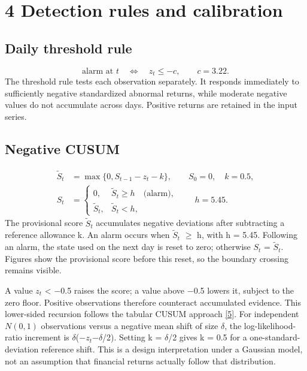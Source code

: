 \documentclass[11pt,a4paper]{article}
\begin{document}
\clearpage
\section*{4 Detection rules and calibration}
\subsection*{Daily threshold rule}
\begin{equation}\text{alarm at }t\quad\Longleftrightarrow\quad z_t\leq-c,\qquad c=3.22.\label{eq:threshold}\end{equation}
The threshold rule tests each observation separately. It responds immediately to sufficiently negative standardized abnormal returns, while moderate negative values do not accumulate across days. Positive returns are retained in the input series.

\subsection*{Negative CUSUM}
\begin{equation}\begin{aligned}\widetilde S_t&=\max\{0,S_{t-1}-z_t-k\},\qquad S_0=0,\quad k=0.5,\\ S_t&=\begin{cases}0,&\widetilde S_t\geq h\quad\text{(alarm)},\\\widetilde S_t,&\widetilde S_t<h,\end{cases}\qquad h=5.45.\end{aligned}\label{eq:cusum}\end{equation}
The provisional score $\widetilde S_t$ accumulates negative deviations after subtracting a reference allowance k. An alarm occurs when $\widetilde S_t$ $\geq$ h, with h = 5.45. Following an alarm, the state used on the next day is reset to zero; otherwise $S_t$ = $\widetilde S_t$. Figures show the provisional score before this reset, so the boundary crossing remains visible.

A value $z_t$ < $-$0.5 raises the score; a value above $-$0.5 lowers it, subject to the zero floor. Positive observations therefore counteract accumulated evidence. This lower-sided recursion follows the tabular CUSUM approach \hyperlink{ref5}{[5]}. For independent $N(0,1)$ observations versus a negative mean shift of size $\delta$, the log-likelihood-ratio increment is $\delta$($-$$z_t$$-$$\delta$/2). Setting k = $\delta$/2 gives k = 0.5 for a one-standard-deviation reference shift. This is a design interpretation under a Gaussian model, not an assumption that financial returns actually follow that distribution.
\end{document}
